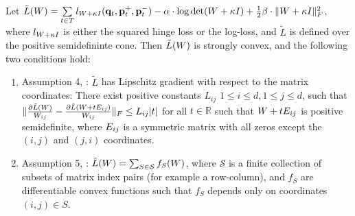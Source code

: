 \documentclass{article}
\begin{document}
\begin{theorem}
  Let $\tilde{L}({W})=\sum\limits_{t\in T}{l_{{W} + \kappa I}({\mathbf{q}}_t, {\mathbf{p}}_{t}^{+},
    {\mathbf{p}}_{t}^{-})} - \alpha \cdot \log \det({W} + \kappa I) +
    \tfrac{1}{2} \beta \cdot \| {W} + \kappa I \|_{F}^{2}$, where
    $l_{{W} + \kappa I}$ is either the squared hinge loss or the
    log-loss, and $\tilde{L}$ is defined over the positive
    semidefininte cone.  Then $\tilde{L}({W})$ is strongly convex, and the
    following two conditions hold:
    \begin{enumerate}
    \item Assumption 4, \citet{richtarik2013optimal}: $\tilde{L}$ has
      Lipschitz gradient with respect to the matrix coordinates: There
      exist positive constants $L_{ij}$ $1 \leq i \leq d, 1 \leq j
      \leq d$, such that $\| \frac{\partial \tilde{L}({W})}{W_{ij}} -
      \frac{\partial \tilde{L}({W} + t {E}_{ij})}{W_{ij}} \|_F \leq
      L_{ij} |t|$ for all $t \in \mathbb{R}$ such that ${W} + t{E}_{ij}$
      is positive semidefinite, where ${E}_{ij}$ is a symmetric matrix
      with all zeros except the $(i,j)$ and $(j,i)$ coordinates.
    \item Assumption 5, \citet{richtarik2013optimal}: $\tilde{L}({W}) = \sum_{S
      \in \mathcal{S}} f_S ({W})$, where $\mathcal{S}$ is a finite
      collection of subsets of matrix index pairs (for example a
      row-column), and $f_S$ are differentiable convex functions such
      that $f_S$ depends only on coordinates $(i,j) \in S$.
    \end{enumerate}
\end{theorem}
\end{document}
